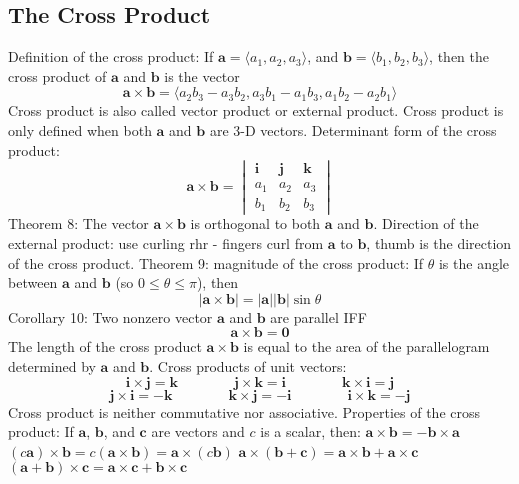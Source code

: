 \documentclass{article}
\begin{document}
    \subsection{The Cross Product}
    \begin{outline}
        \1 Definition of the cross product: If \(\mathbf a=\langle a_1,a_2,a_3\rangle\), and \(\mathbf b=\langle b_1,b_2,b_3\rangle\), then the cross product of \(\mathbf a\) and \(\mathbf b\) is the vector \[\mathbf{a\times b}=\langle a_2b_3-a_3b_2,a_3b_1-a_1b_3,a_1b_2-a_2b_1\rangle\]
        \1 Cross product is also called vector product or external product. 
        \1 Cross product is only defined when both \(\mathbf a\) and \(\mathbf b\) are 3-D vectors. 
        \1 Determinant form of the cross product: \[\mathbf{a\times b}=\begin{vmatrix}
            \mathbf i & \mathbf j & \mathbf k\\
            a_1 & a_2 & a_3\\
            b_1 & b_2 & b_3
        \end{vmatrix}\]
        \1 Theorem 8: The vector \(\mathbf{a\times b}\) is orthogonal to both \(\mathbf a\) and \(\mathbf b\). 
        \1 Direction of the external product: use curling rhr - fingers curl from \(\mathbf a\) to \(\mathbf b\), thumb is the direction of the cross product. 
        \1 Theorem 9: magnitude of the cross product: If \(\theta\) is the angle between \(\mathbf a\) and \(\mathbf b\) (so \(0\leq\theta\leq\pi\)), then \[|\mathbf{a\times b}|=|\mathbf a||\mathbf b|\sin\theta\]
        \1 Corollary 10: Two nonzero vector \(\mathbf a\) and \(\mathbf b\) are parallel IFF \[\mathbf{a\times b}=\mathbf 0\]
        \1 The length of the cross product \(\mathbf{a\times b}\) is equal to the area of the parallelogram determined by \(\mathbf a\) and \(\mathbf b\). 
        \1 Cross products of unit vectors: \[\mathbf{i\times j=k} \qquad \qquad \mathbf{j\times k=i} \qquad \qquad \mathbf{k\times i=j}\]\[\mathbf{j\times i=-k} \qquad \qquad \mathbf{k\times j=-i} \qquad \qquad \mathbf{i\times k=-j}\]
        \1 Cross product is neither commutative nor associative. 
        \1 Properties of the cross product: If \(\mathbf a\), \(\mathbf b\), and \(\mathbf c\) are vectors and \(c\) is a scalar, then: 
            \2 \(\mathbf{a\times b=-b\times a}\)
            \2 \((c\mathbf a)\times \mathbf b=c(\mathbf{a\times b})=\mathbf a\times(c\mathbf b)\)
            \2 \(\mathbf{a}\times(\mathbf{b+c})=\mathbf{a\times b+a\times c}\)
            \2 \((\mathbf{a+b})\times \mathbf c=\mathbf{a\times c+b\times c}\)

\end{outline}
\end{document}
